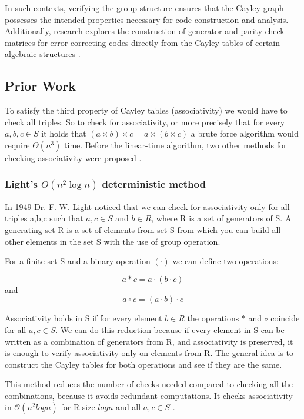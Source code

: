 \documentclass[sigconf]{acmart}
\begin{document}
In such contexts, verifying the group structure ensures that the Cayley graph possesses
the intended properties necessary for code construction and analysis. Additionally, research explores the construction of generator
and parity check matrices for error-correcting codes directly from the Cayley tables of certain algebraic structures \cite{zurekCodingTheory}.

\subsection{Prior Work}
To satisfy the third property of Cayley tables (associativity) we would have to check all triples. So to check for associativity, or more precisely that for every \(a,b,c  \in S\) it holds that \((a\times b)\times c = a\times (b\times c)\) a brute force algorithm would require \(\Theta(n^3)\) time. Before the linear-time algorithm, two other methods for checking associativity were proposed \cite{10756141}.
\subsubsection{Light's \( O(n^2 \log n) \) deterministic method}
In 1949 Dr. F. W. Light noticed that we can check for associativity only for all triples a,b,c such that \(a,c \in S\) and \(b\in R\), where R is a set of generators of S. A generating set R is a set of elements from set S from which you can build all other elements in the set S with the use of group operation. 

For a finite set S and a binary operation \((\cdot)\) we can define two operations:

\[a * c = a\cdot(b\cdot c)\] and
\[a \circ c= (a\cdot b)\cdot c\]

Associativity holds in S if for every element \(b \in R\) the operations \(*\) and \(\circ\) coincide for all \(a,c \in S\). We can do this reduction because if every element in S can be written as a combination of generators from R, and associativity is preserved, it is enough to verify associativity only on elements from R.
The general idea is to construct the Cayley tables for both operations and see if they are the same.

This method reduces the number of checks needed compared to checking all the combinations, because it avoids redundant computations. It checks associativity in \(\mathcal{O}(n^2logn)\) for R size \(logn\) and all \(a,c \in S\) \cite{clifford1961algebraic}.
\end{document}
